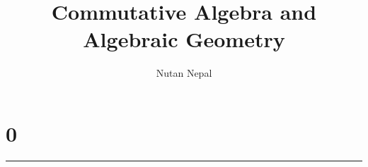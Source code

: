 
\title{Commutative Algebra and Algebraic Geometry}
\author{Nutan Nepal}



\maketitle
\section*{0}

\hrule
\begin{problems}
\end{problems}
\begin{questions}
    
    
    
    
    
    
\end{questions}
\section*{}

